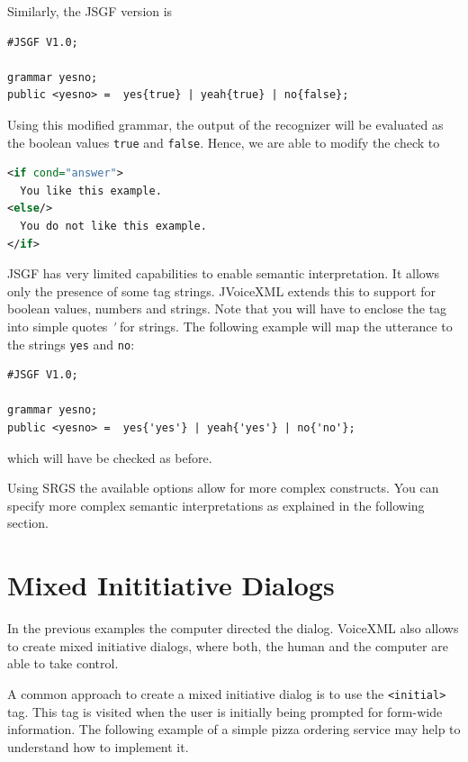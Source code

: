 \documentclass[11pt,a4paper]{book}
\begin{document}
Similarly, the JSGF version is

\begin{lstlisting}
#JSGF V1.0;

grammar yesno;
public <yesno> =  yes{true} | yeah{true} | no{false};
\end{lstlisting}

Using this modified grammar, the output of the recognizer will be evaluated
as the boolean values \lstinline{true} and \lstinline{false}. Hence, we are
able to modify the check to

\begin{lstlisting}[language=XML]
<if cond="answer">
  You like this example.
<else/>
  You do not like this example.
</if>
\end{lstlisting}

JSGF has very limited capabilities to enable semantic interpretation.
It allows only the presence of some tag strings. JVoiceXML extends this to
support for boolean values, numbers and strings. Note that you will have to 
enclose the tag into simple quotes \emph{\'} for strings.
The following example will map the utterance to the strings \lstinline{yes}
and \lstinline{no}:
\begin{lstlisting}
#JSGF V1.0;

grammar yesno;
public <yesno> =  yes{'yes'} | yeah{'yes'} | no{'no'};
\end{lstlisting}
which will have be checked as before.

Using SRGS the available options allow for more complex constructs. You can
specify more complex semantic interpretations as explained in the following
section.

\section{Mixed Inititiative Dialogs}

In the previous examples the computer directed the dialog. VoiceXML also allows
to create mixed initiative dialogs, where both, the human and the computer
are able to take control.

A common approach to create a mixed initiative dialog is to use the
\lstinline{<initial>} tag.
This tag is visited when the user is initially being prompted for form-wide
information.
The following example of a simple pizza ordering service may help to understand
how to implement it.
\end{document}
